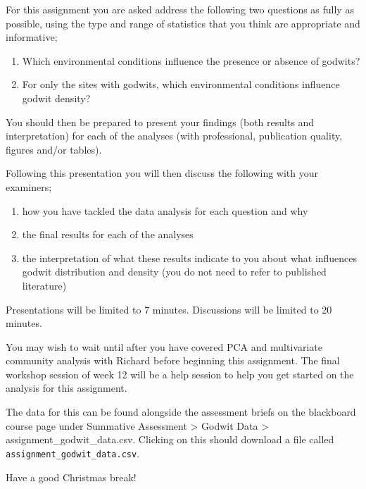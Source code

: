 \documentclass[
]{book}
\providecommand{\tightlist}{%
  \setlength{\itemsep}{0pt}\setlength{\parskip}{0pt}}
\begin{document}
For this assignment you are asked address the following two questions as fully as possible, using the type and range of statistics that you think are appropriate and informative;

\begin{enumerate}
\def\labelenumi{\arabic{enumi})}
\item
  Which environmental conditions influence the presence or absence of godwits?
\item
  For only the sites with godwits, which environmental conditions influence godwit density?
\end{enumerate}

You should then be prepared to present your findings (both results and interpretation) for each of the analyses (with professional, publication quality, figures and/or tables).

Following this presentation you will then discuss the following with your examiners;

\begin{enumerate}
\def\labelenumi{\arabic{enumi})}
\tightlist
\item
  how you have tackled the data analysis for each question and why
\item
  the final results for each of the analyses
\item
  the interpretation of what these results indicate to you about what influences godwit distribution and density (you do not need to refer to published literature)
\end{enumerate}

Presentations will be limited to 7 minutes.
Discussions will be limited to 20 minutes.

You may wish to wait until after you have covered PCA and multivariate community analysis with Richard before beginning this assignment. The final workshop session of week 12 will be a help session to help you get started on the analysis for this assignment.

The data for this can be found alongside the assessment briefs on the blackboard course page under Summative Assessment \textgreater{} Godwit Data \textgreater{} assignment\_godwit\_data.csv. Clicking on this should download a file called \texttt{assignment\_godwit\_data.csv}.

Have a good Christmas break!

  
\end{document}
